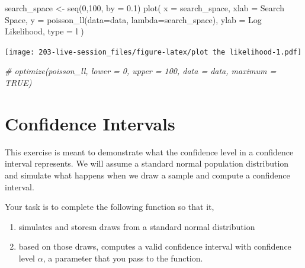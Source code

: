 \documentclass[
]{book}
\newenvironment{Shaded}{\begin{snugshade}}{\end{snugshade}}
\newcommand{\AttributeTok}[1]{\textcolor[rgb]{0.77,0.63,0.00}{#1}}
\newcommand{\CommentTok}[1]{\textcolor[rgb]{0.56,0.35,0.01}{\textit{#1}}}
\newcommand{\DecValTok}[1]{\textcolor[rgb]{0.00,0.00,0.81}{#1}}
\newcommand{\FloatTok}[1]{\textcolor[rgb]{0.00,0.00,0.81}{#1}}
\newcommand{\FunctionTok}[1]{\textcolor[rgb]{0.00,0.00,0.00}{#1}}
\newcommand{\NormalTok}[1]{#1}
\newcommand{\OtherTok}[1]{\textcolor[rgb]{0.56,0.35,0.01}{#1}}
\newcommand{\StringTok}[1]{\textcolor[rgb]{0.31,0.60,0.02}{#1}}
\providecommand{\tightlist}{%
  \setlength{\itemsep}{0pt}\setlength{\parskip}{0pt}}
\theoremstyle{definition}
\theoremstyle{definition}
\theoremstyle{definition}
\theoremstyle{definition}
\theoremstyle{remark}
\begin{document}
\begin{Shaded}
\begin{Highlighting}[]
\NormalTok{search\_space }\OtherTok{\textless{}{-}} \FunctionTok{seq}\NormalTok{(}\DecValTok{0}\NormalTok{,}\DecValTok{100}\NormalTok{, }\AttributeTok{by =} \FloatTok{0.1}\NormalTok{)}
\FunctionTok{plot}\NormalTok{(}
  \AttributeTok{x =}\NormalTok{ search\_space, }\AttributeTok{xlab =} \StringTok{\textquotesingle{}Search Space\textquotesingle{}}\NormalTok{,}
  \AttributeTok{y =} \FunctionTok{poisson\_ll}\NormalTok{(}\AttributeTok{data=}\NormalTok{data, }\AttributeTok{lambda=}\NormalTok{search\_space), }\AttributeTok{ylab =} \StringTok{\textquotesingle{}Log Likelihood\textquotesingle{}}\NormalTok{,}
  \AttributeTok{type =} \StringTok{\textquotesingle{}l\textquotesingle{}}
\NormalTok{)}
\end{Highlighting}
\end{Shaded}

\texttt{[image: 203-live-session\_files/figure-latex/plot the likelihood-1.pdf]}

\begin{Shaded}
\begin{Highlighting}[]
\CommentTok{\# optimize(poisson\_ll, lower = 0, upper = 100, data = data, maximum = TRUE)}
\end{Highlighting}
\end{Shaded}

\hypertarget{confidence-intervals}{%
\section{Confidence Intervals}\label{confidence-intervals}}

This exercise is meant to demonstrate what the confidence level in a confidence interval represents. We will assume a standard normal population distribution and simulate what happens when we draw a sample and compute a confidence interval.

Your task is to complete the following function so that it,

\begin{enumerate}
\def\labelenumi{\arabic{enumi})}
\tightlist
\item
  simulates and stores\texttt{}n draws from a standard normal distribution
\item
  based on those draws, computes a valid confidence interval with confidence level \(\alpha\), a parameter that you pass to the function.
\end{enumerate}
\end{document}

